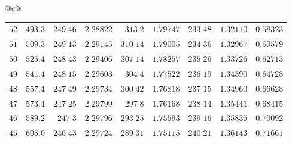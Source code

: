 \begin{center}
{\begin{tabular}{@{}c@{}}
\begin{tabular}{r|r|r|r|r|r|r|r|r}
$52$&$493.3$&$249\;46$&$2.28822$&$313\;2$&$1.79747$&$233\;48$&$1.32110$&$0.58323$\\
$51$&$509.3$&$249\;13$&$2.29145$&$310\;14$&$1.79005$&$234\;36$&$1.32967$&$0.60579$\\[2pt]
$50$&$525.4$&$248\;43$&$2.29406$&$307\;14$&$1.78257$&$235\;26$&$1.33726$&$0.62713$\\
$49$&$541.4$&$248\;15$&$2.29603$&$304\;4$&$1.77522$&$236\;19$&$1.34390$&$0.64728$\\
$48$&$557.4$&$247\;49$&$2.29734$&$300\;42$&$1.76818$&$237\;15$&$1.34960$&$0.66628$\\
$47$&$573.4$&$247\;25$&$2.29799$&$297\;8$&$1.76168$&$238\;14$&$1.35441$&$0.68415$\\
$46$&$589.2$&$247\;3$&$2.29796$&$293\;25$&$1.75593$&$239\;16$&$1.35835$&$0.70092$\\[2pt]
$45$&$605.0$&$246\;43$&$2.29724$&$289\;31$&$1.75115$&$240\;21$&$1.36143$&$0.71661$\\
\end{tabular}
\end{tabular}%
}
\end{center}
\endgroup
\clearpage
{}
\begingroup
\fontsize{9}{10.2}\selectfont
\setlength{\tabcolsep}{1.5pt}
\renewcommand{\arraystretch}{1.02}
